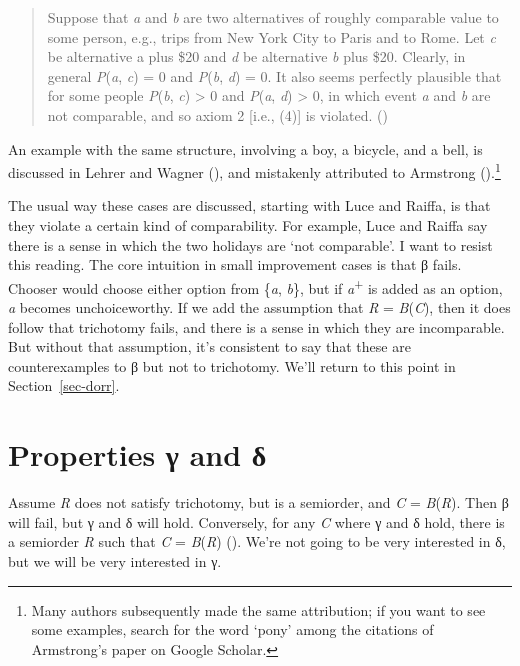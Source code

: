 \documentclass[
  11pt,
  letterpaper,
  DIV=11,
  numbers=noendperiod,
  twoside]{scrartcl}
\begin{document}
\begin{quote}
Suppose that \emph{a} and \emph{b} are two alternatives of roughly
comparable value to some person, e.g., trips from New York City to Paris
and to Rome. Let \emph{c} be alternative a plus \$20 and \emph{d} be
alternative \emph{b} plus \$20. Clearly, in general \emph{P}(\emph{a},
\emph{c}) = 0 and \emph{P}(\emph{b}, \emph{d}) = 0. It also seems
perfectly plausible that for some people \emph{P}(\emph{b}, \emph{c})
\textgreater{} 0 and \emph{P}(\emph{a}, \emph{d}) \textgreater{} 0, in
which event \emph{a} and \emph{b} are not comparable, and so axiom 2
{[}i.e., (4){]} is violated. ()
\end{quote}

An example with the same structure, involving a boy, a bicycle, and a
bell, is discussed in Lehrer and Wagner
(), and mistakenly attributed to
Armstrong ().\footnote{Many authors
  subsequently made the same attribution; if you want to see some
  examples, search for the word `pony' among the citations of
  Armstrong's paper on Google Scholar.}

The usual way these cases are discussed, starting with Luce and Raiffa,
is that they violate a certain kind of comparability. For example, Luce
and Raiffa say there is a sense in which the two holidays are `not
comparable'. I want to resist this reading. The core intuition in small
improvement cases is that β fails. Chooser would choose either option
from \{\emph{a}, \emph{b}\}, but if \emph{a}\textsuperscript{+} is added
as an option, \emph{a} becomes unchoiceworthy. If we add the assumption
that \emph{R} = \emph{B}(\emph{C}), then it does follow that trichotomy
fails, and there is a sense in which they are incomparable. But without
that assumption, it's consistent to say that these are counterexamples
to β but not to trichotomy. We'll return to this point in
Section~\ref{sec-dorr}.

\section{Properties γ and δ}\label{sec-gamma}

Assume \emph{R} does not satisfy trichotomy, but is a semiorder, and
\emph{C} = \emph{B}(\emph{R}). Then β will fail, but γ and δ will hold.
Conversely, for any \emph{C} where γ and δ hold, there is a semiorder
\emph{R} such that \emph{C} = \emph{B}(\emph{R})
(). We're not going
to be very interested in δ, but we will be very interested in γ.
\end{document}
